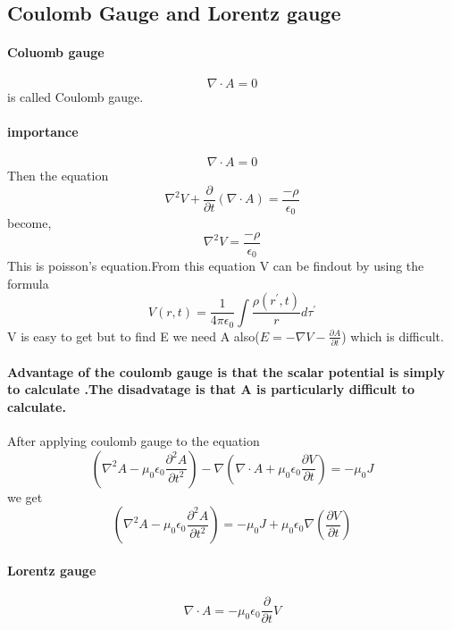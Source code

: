 \begin{center}
\end{center}
\subsection{Coulomb Gauge and Lorentz gauge}
\paragraph{Coluomb gauge}
$$\nabla \cdot A=0$$ is called Coulomb gauge.\\
\paragraph{importance}
$$\nabla \cdot A=0$$ Then the equation 
$$\nabla ^2V+\frac{\partial }{\partial t}(\nabla \cdot A)=\frac{-\rho}{\epsilon_{0}}$$ become,\\
$$\nabla^2 V=\frac{-\rho}{\epsilon_{0}}$$
This is poisson's equation.From this equation V can be findout by using the formula\\
$$V(r,t)=\frac{1}{4 \pi \epsilon_0}\int \frac{\rho(r^{\prime},t)}{r}d\tau^{\prime}$$
V is easy to get but to find E we need  A also($E=-\nabla V-\frac{\partial A}{\partial t}$) which is difficult.
\paragraph{Advantage of the coulomb gauge is that the scalar potential is simply to calculate .The disadvatage is that  A is particularly difficult to calculate. }
After applying coulomb gauge to the equation 
$$\left( \nabla^2A-\mu_{0}\epsilon_{0}\frac{\partial^2 A}{\partial t^2}\right) -\nabla\left( \nabla \cdot A+\mu_{0}\epsilon_{0}\frac{\partial V}{\partial t}\right) =-\mu_{0} J$$ 
we get\\
$$\left( \nabla^2A-\mu_{0}\epsilon_{0}\frac{\partial^2 A}{\partial t^2}\right)=-\mu_{0}J+\mu_{0} \epsilon_{0}\nabla \left( \frac{\partial V}{\partial t}\right) $$
\paragraph{Lorentz gauge}
$$\nabla \cdot A =-\mu_{0} \epsilon_{0} \frac{\partial}{\partial t}V$$

